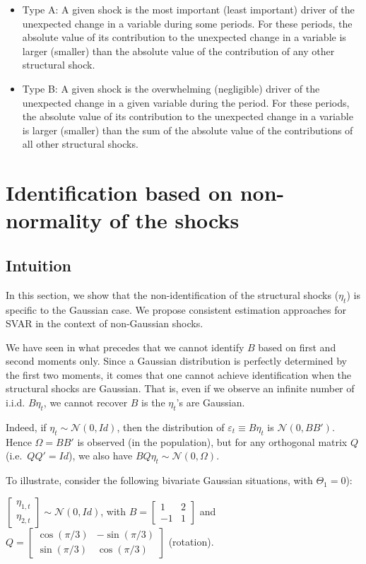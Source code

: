 \documentclass[
  12pt,
]{book}
\providecommand{\tightlist}{%
  \setlength{\itemsep}{0pt}\setlength{\parskip}{0pt}}
\theoremstyle{definition}
\theoremstyle{definition}
\theoremstyle{definition}
\theoremstyle{definition}
\theoremstyle{remark}
\begin{document}
\begin{itemize}
\tightlist
\item
  Type A: A given shock is the most important (least important) driver of the unexpected change in a variable during some periods. For these periods, the absolute value of its contribution to the unexpected change in a variable is larger (smaller) than the absolute value of the contribution of any other structural shock.
\item
  Type B: A given shock is the overwhelming (negligible) driver of the unexpected change in a given variable during the period. For these periods, the absolute value of its contribution to the unexpected change in a variable is larger (smaller) than the sum of the absolute value of the contributions of all other structural shocks.
\end{itemize}

\chapter{Identification based on non-normality of the shocks}\label{NonGaussian}

\section{Intuition}\label{intuition}

In this section, we show that the non-identification of the structural shocks (\(\eta_t\)) is specific to the Gaussian case. We propose consistent estimation approaches for SVAR in the context of non-Gaussian shocks.

We have seen in what precedes that we cannot identify \(B\) based on first and second moments only. Since a Gaussian distribution is perfectly determined by the first two moments, it comes that one cannot achieve identification when the structural shocks are Gaussian. That is, even if we observe an infinite number of i.i.d. \(B \eta_t\), we cannot recover \(B\) is the \(\eta_t\)'s are Gaussian.

Indeed, if \(\eta_t \sim \mathcal{N}(0,Id)\), then the distribution of \(\varepsilon_t \equiv B \eta_t\) is \(\mathcal{N}(0,BB')\). Hence \(\Omega = B B'\) is observed (in the population), but for any orthogonal matrix \(Q\) (i.e.~\(QQ'=Id\)), we also have \(BQ \eta_t \sim \mathcal{N}(0,\Omega)\).

To illustrate, consider the following bivariate Gaussian situations, with \(\Theta_1=0\)):

\(\left[\begin{array}{c}\eta_{1,t}\\ \eta_{2,t}\end{array}\right]\sim \mathcal{N}(0,Id)\), with
\(B = \left[\begin{array}{cc}
1 & 2 \\
-1 & 1
\end{array}\right]\) and
\(Q = \left[\begin{array}{cc}
\cos(\pi/3) & -\sin(\pi/3) \\
\sin(\pi/3) & \cos(\pi/3)
\end{array}\right]\) (rotation).
\end{document}
